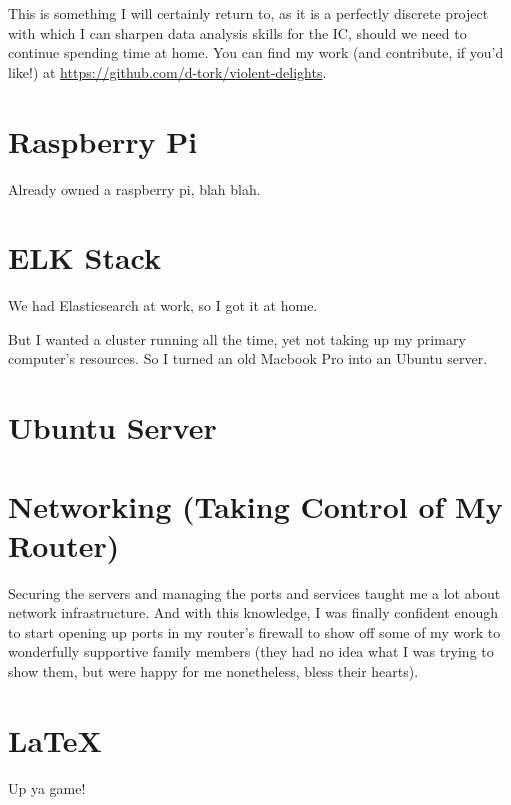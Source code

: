 \documentclass[letterpaper,11pt,onecolumn]{article}
\begin{document}
This is something I will certainly return to, as it is a perfectly discrete project with which I 
can sharpen data analysis skills for the IC, should we need to continue spending time at home. You
can find my work (and contribute, if you'd like!) at \url{https://github.com/d-tork/violent-delights}.

\section{Raspberry Pi}
Already owned a raspberry pi, blah blah.

\section{ELK Stack}
We had Elasticsearch at work, so I got it at home.

But I wanted a cluster running all the time, yet not taking up my primary computer's resources.
So I turned an old Macbook Pro into an Ubuntu server.

\section{Ubuntu Server}

\section{Networking (Taking Control of My Router)}

Securing the servers and managing the ports and services taught me a lot about network 
infrastructure. And with this knowledge, I was finally confident enough to start opening up ports
in my router's firewall to show off some of my work to wonderfully supportive family members (they
had no idea what I was trying to show them, but were happy for me nonetheless, bless their hearts). 

\section{LaTeX}

Up ya game!
\end{document}
